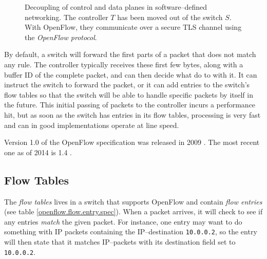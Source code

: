 \begin{figure}
  \centering
  \caption{Decoupling of control and data planes in software--defined
    networking.  The controller $T$ has been moved out of the switch $S$.
      With OpenFlow, they communicate over a secure TLS channel using the
      \textit{OpenFlow protocol}.}

  \label{figure:decoupling.planes}
\end{figure}

By default, a switch will forward the first parts of a packet that does not
match any rule.  The controller typically receives these first few bytes,
along with a buffer ID of the complete packet, and can then decide
what do to with it.  It can instruct the switch to forward the packet,
or it can add entries to the switch's flow tables so that the switch
will be able to handle specific packets by itself in the future.  This
initial passing of packets to the controller incurs a performance hit,
but as soon as the switch has entries in its flow tables, processing
is very fast and can in good implementations operate at line speed.

Version 1.0 of the OpenFlow specification was released in 2009
\cite{openflow-1.0} \cite{openflow-1.0.1} \cite{openflow-1.0.2}.
The most recent one as of 2014 is 1.4 \cite{openflow-1.4}.

\subsection{Flow Tables}

The \textit{flow tables} lives in a switch that supports OpenFlow and
contain \textit{flow entries} (see table \ref{openflow.flow.entry.spec}).
When a packet arrives, it will check to see
if any entries \textit{match} the given packet.  For instance, one entry may
want to do something with \ac{IP} packets containing the IP--destination
\texttt{10.0.0.2}, so the entry
will then state that it matches IP--packets with its destination field set
to \texttt{10.0.0.2}.

